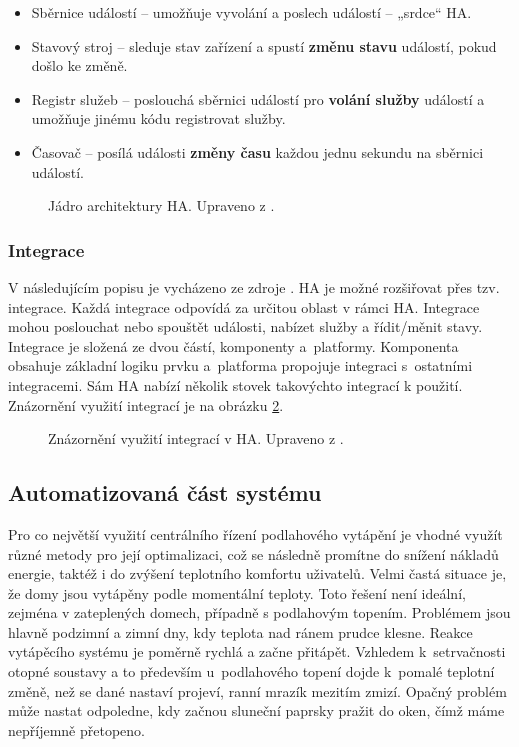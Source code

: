 \begin{itemize}
\item Sběrnice událostí – umožňuje vyvolání a poslech událostí – „srdce“ HA.
\item Stavový stroj – sleduje stav zařízení a spustí \textbf{změnu stavu} událostí, pokud došlo ke změně.
\item  Registr služeb – poslouchá sběrnici událostí pro \textbf{volání služby} událostí a umožňuje jinému kódu registrovat služby.
\item Časovač – posílá události \textbf{změny času} každou jednu sekundu na sběrnici událostí.
\end{itemize}

\begin{figure}[H]
    \centering
    \def\svgwidth{\columnwidth}
    
    \caption[Jádro architektury HA.]{Jádro architektury HA. Upraveno z \cite{home-assistant-jadro-architektury}.}
    \label{fig:ha-jadro-architektury}
\end{figure}

\subsubsection{Integrace}
V následujícím popisu je vycházeno ze zdroje \cite{home-assistant-integrace}. HA je možné rozšiřovat přes tzv. integrace. Každá integrace odpovídá za určitou oblast v rámci HA. Integrace mohou poslouchat nebo spouštět  události, nabízet služby a řídit/měnit stavy.  Integrace je složená ze dvou částí, komponenty a~platformy. Komponenta obsahuje základní logiku prvku a~platforma propojuje integraci s~ostatními integracemi. Sám HA nabízí několik stovek takovýchto integrací k použití. Znázornění využití integrací je na obrázku \ref{fig:ha-integrace}.

\begin{figure}[H]
    \centering
    \def\svgwidth{\columnwidth}
    
    \caption[Znázornění využití integrací v~HA.]{Znázornění využití integrací v HA. Upraveno z \cite{home-assistant-integrace}.}
    \label{fig:ha-integrace}
\end{figure}



\subsection{Automatizovaná část systému}
Pro co největší využití centrálního řízení podlahového vytápění je vhodné využít různé metody pro její optimalizaci, což se následně promítne do snížení nákladů energie, taktéž i do zvýšení teplotního komfortu uživatelů. Velmi častá situace je, že domy jsou vytápěny podle momentální teploty. Toto řešení není ideální, zejména v zateplených domech, případně s podlahovým topením. Problémem jsou hlavně podzimní a zimní dny, kdy teplota nad ránem prudce klesne. Reakce vytápěcího systému je poměrně rychlá a začne přitápět. Vzhledem k~setrvačnosti otopné soustavy a to především u~podlahového topení dojde k~pomalé teplotní změně, než se dané nastaví projeví, ranní mrazík mezitím zmizí. Opačný problém může nastat odpoledne, kdy začnou sluneční paprsky pražit do oken, čímž máme nepříjemně přetopeno.

